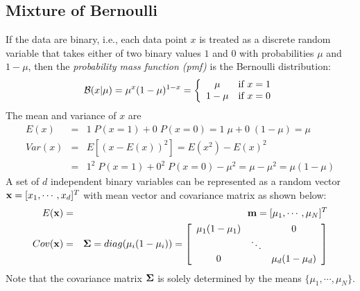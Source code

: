 \documentclass{article}
\begin{document}


\subsection{Mixture of Bernoulli}

If the data are binary, i.e., each data point $x$ is treated 
as a discrete random variable that takes either of two binary 
values $1$ and $0$ with probabilities $\mu$ and $1-\mu$, then 
the {\em probability mass function (pmf)} is the Bernoulli 
distribution:
\begin{equation}
  {\cal B}(x|\mu)=\mu^x(1-\mu)^{1-x}=\left\{\begin{array}{cl}
  \mu & \mbox{if $x=1$} \\  1-\mu & \mbox{if $x=0$} \end{array}\right.
\end{equation}
The mean and variance of $x$ are
\begin{eqnarray}
  E(x)&=&1\;P(x=1)+0\;P(x=0)=1\;\mu+0\;(1-\mu)=\mu
  \\
  Var(x)&=&E[(x-E(x))^2]=E(x^2)-E(x)^2
  \nonumber\\
  &=&1^2\;P(x=1)+0^2\;P(x=0)-\mu^2=\mu-\mu^2=\mu(1-\mu)
\end{eqnarray}
A set of $d$ independent binary variables can be represented 
as a random vector ${\bf x}=[x_1,\cdots,x_d]^T$ with mean vector
and covariance matrix as shown below:
\begin{eqnarray}
  E({\bf x})&=&{\bf m}=[\mu_1,\cdots,\mu_N]^T
  \\
  Cov({\bf x})&=&{\bf\Sigma}=diag( \mu_i(1-\mu_i) )
  =\left[ \begin{array}{ccc}
      \mu_1(1-\mu_1) & & 0 \\ & \ddots & \\
      0 & & \mu_d(1-\mu_d)\end{array}\right]
\end{eqnarray}
Note that the covariance matrix ${\bf\Sigma}$ is solely determined 
by the means $\{\mu_1,\cdots,\mu_N\}$.
\end{document}
